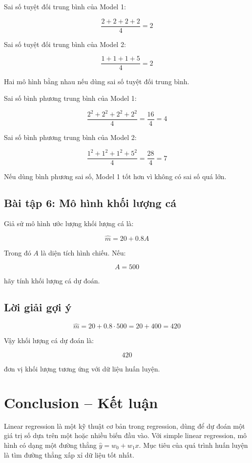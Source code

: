 Sai số tuyệt đối trung bình của Model 1:

\[
    \frac{2+2+2+2}{4}=2
\]

Sai số tuyệt đối trung bình của Model 2:

\[
    \frac{1+1+1+5}{4}=2
\]

Hai mô hình bằng nhau nếu dùng sai số tuyệt đối trung bình.

Sai số bình phương trung bình của Model 1:

\[
    \frac{2^2+2^2+2^2+2^2}{4}
    =
    \frac{16}{4}=4
\]

Sai số bình phương trung bình của Model 2:

\[
    \frac{1^2+1^2+1^2+5^2}{4}
    =
    \frac{28}{4}=7
\]

Nếu dùng bình phương sai số, Model 1 tốt hơn vì không có sai số quá lớn.

\subsection*{Bài tập 6: Mô hình khối lượng cá}

Giả sử mô hình ước lượng khối lượng cá là:

\[
    \hat{m}=20+0.8A
\]

Trong đó $A$ là diện tích hình chiếu. Nếu:

\[
    A=500
\]

hãy tính khối lượng cá dự đoán.

\subsection*{Lời giải gợi ý}

\[
    \hat{m}=20+0.8\cdot500=20+400=420
\]

Vậy khối lượng cá dự đoán là:

\[
    420
\]

đơn vị khối lượng tương ứng với dữ liệu huấn luyện.

\section*{Conclusion -- Kết luận}

Linear regression là một kỹ thuật cơ bản trong regression, dùng để dự đoán một giá trị số dựa trên một hoặc nhiều biến đầu vào. Với simple linear regression, mô hình có dạng một đường thẳng $\hat{y}=w_0+w_1x$. Mục tiêu của quá trình huấn luyện là tìm đường thẳng xấp xỉ dữ liệu tốt nhất.

